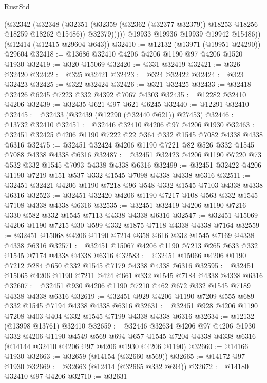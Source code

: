 \begin{lexlean}{RustStd}
\begin{coremodule}
              (@32342
                (@32348
                  (@32351 (@32359 (@32362 (@32377 @32379)) @18253 @18256 @18259 @18262 @15486))
                  @32379)))))
        @19933
        @19936
        @19939
        @19942
        @15486))
    (@12414 (@12415 @29604 @643))
@32410 := @12132 (@13971 (@19951 @24290)) @29604
@32418 := @13686 @32410 @4206 @4206 @1190 @97 @4206 @1520 @1930
@32419 := @320 @15069
@32420 := @331 @32419
@32421 := @326 @32420
@32422 := @325 @32421
@32423 := @324 @32422
@32424 := @323 @32423
@32425 := @322 @32424
@32426 := @321 @32425
@32433 := @32418 @32426 @6245 @7223 @332 @4392 @7067 @4303
@32435 := @12282 @32410 @4206
@32439 := @32435 @621 @97 @621 @6245
@32440 := @12291 @32410
@32445 := @32433 (@32439 (@12290 (@32440 @621)) @27453)
@32446 := @13732 @32410
@32451 := @32446 @32410 @4206 @97 @4206 @1930
@32463 := @32451 @32425 @4206 @1190 @7222 @22 @364 @332 @1545 @7082 @4338 @4338 @6316
@32475 := @32451 @32424 @4206 @1190 @7221 @82 @526 @332 @1545 @7088 @4338 @4338 @6316
@32487 := @32451 @32423 @4206 @1190 @7220 @73 @532 @332 @1545 @7093 @4338 @4338 @6316
@32499 := @32451 @32422 @4206 @1190 @7219 @151 @537 @332 @1545 @7098 @4338 @4338 @6316
@32511 := @32451 @32421 @4206 @1190 @7218 @96 @548 @332 @1545 @7103 @4338 @4338 @6316
@32523 := @32451 @32420 @4206 @1190 @7217 @108 @563 @332 @1545 @7108 @4338 @4338 @6316
@32535 := @32451 @32419 @4206 @1190 @7216 @330 @582 @332 @1545 @7113 @4338 @4338 @6316
@32547 := @32451 @15069 @4206 @1190 @7215 @30 @599 @332 @1875 @7118 @4338 @4338 @7164
@32559 := @32451 @15068 @4206 @1190 @7214 @358 @616 @332 @1545 @7169 @4338 @4338 @6316
@32571 := @32451 @15067 @4206 @1190 @7213 @265 @633 @332 @1545 @7174 @4338 @4338 @6316
@32583 := @32451 @15066 @4206 @1190 @7212 @284 @650 @332 @1545 @7179 @4338 @4338 @6316
@32595 := @32451 @15065 @4206 @1190 @7211 @424 @661 @332 @1545 @7184 @4338 @4338 @6316
@32607 := @32451 @930 @4206 @1190 @7210 @462 @672 @332 @1545 @7189 @4338 @4338 @6316
@32619 := @32451 @929 @4206 @1190 @7209 @555 @689 @332 @1545 @7194 @4338 @4338 @6316
@32631 := @32451 @928 @4206 @1190 @7208 @403 @404 @332 @1545 @7199 @4338 @4338 @6316
@32634 := @12132 (@13998 @13761) @32410
@32659 := @32446
    @32634
    @4206
    @97
    @4206
    @1930
    @332
    @4206
    @1190
    @4549
    @569
    @694
    @657
    @1545
    @7204
    @4338
    @4338
    @6316
    (@14144 @32410 @4206 @97 @4206 @1930 @4206 @1190)
@32660 := @14166 @1930
@32663 := @32659 (@14154 (@32660 @569))
@32665 := @14172 @97 @1930
@32669 := @32663 (@12414 (@32665 @332 @694))
@32672 := @14180 @32410 @97 @4206
@32710 := @32631

\end{coremodule}
\end{lexlean}
